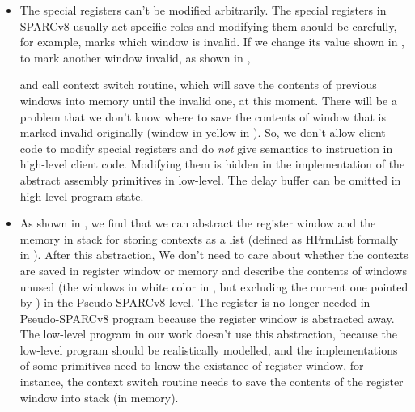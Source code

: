 \begin{itemize}
    \item 
    The special registers can't be modified arbitrarily.
    The special registers in SPARCv8 usually act specific 
    roles and modifying them should be carefully, 
    for example, \regwim{} marks which window is 
    invalid. If we change its value shown in 
    \Fig{\ref{fig:Abstraction of Register Windows and Memory}}, 
    to mark another window invalid, as shown in 
    \Fig{\ref{fig:problem of modifying wim arbitrary}},  
    \begin{center}
        \vspace*{-0.5em}
        
        \vspace*{-0.5em}
        \label{fig:problem of modifying wim arbitrary}
    \end{center}
    and call context switch routine, which will  
    save the contents of previous windows into memory
    until the invalid one, at this moment. 
    There will be a problem that we don't know 
    where to save the contents of window that 
    is marked invalid originally 
    (window in yellow in \Fig{\ref{fig:problem of modifying wim arbitrary}}). 
    So, we don't allow client code 
    to modify special registers and do \textit{not} 
    give semantics to \cwr{} instruction in high-level 
    client code. Modifying them is hidden in the 
    implementation of the abstract assembly primitives
    in low-level. 
    The delay buffer can be omitted in high-level
    program state. 
    \item 
    As shown in \Fig{\ref{fig:Abstraction of Register Windows and Memory}}, 
    we find that we can abstract the register window 
    and the memory in stack for storing contexts 
    as a list (defined as 
    HFrmList formally in \Fig{\ref{fig:machine-state-concur-pseudo-sparc}}).  
    After this abstraction, We don't need to care about 
    whether the contexts are saved in register window or 
    memory and describe the contents of windows unused 
    (the windows in white color in 
    \Fig{\ref{fig:Abstraction of Register Windows and Memory}}, 
    but excluding the current one pointed by \regcwp{}) 
    in the Pseudo-SPARCv8 level. 
    The \regcwp{} register is no longer needed in 
    Pseudo-SPARCv8 program because the register window 
    is abstracted away. 
    The low-level program in our work doesn't use this 
    abstraction, because the low-level program 
    should be realistically modelled, 
    and the implementations of some primitives 
    need to know the existance of register window,  
    for instance, the context switch routine 
    needs to save the contents 
    of the register window into stack (in memory).
\end{itemize}

